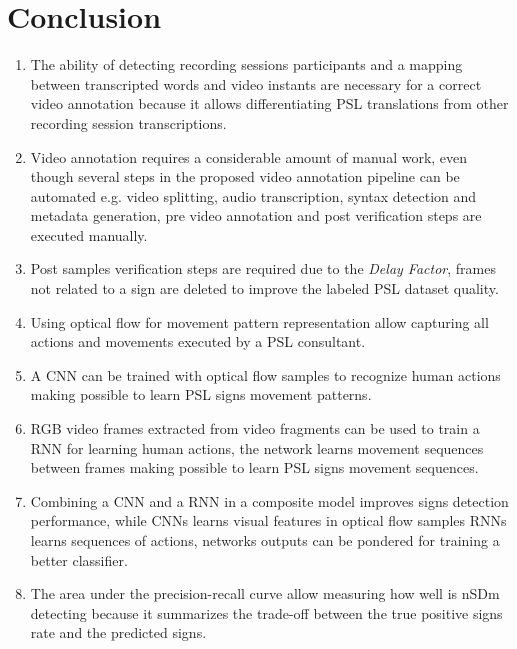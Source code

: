 \documentclass[twocolumn,conference]{article}
\begin{document}
\section{Conclusion}\label{conclusion}
\begin{enumerate}[i]
\item The ability of detecting recording sessions participants and a mapping between transcripted words and video instants are necessary for a correct video annotation because it allows differentiating PSL translations from other recording session transcriptions.
\item Video annotation requires a considerable amount of manual work, even though several steps in the proposed video annotation pipeline can be automated e.g. video splitting, audio transcription, syntax detection and metadata generation, pre video annotation and post verification steps are executed manually.
\item Post samples verification steps are required due to the \textit{Delay Factor}, frames not related to a sign are deleted to improve the labeled PSL dataset quality.
\item Using optical flow for movement pattern representation allow capturing all actions and movements executed by a PSL consultant.
\item A CNN can be trained with optical flow samples to recognize human actions making possible to learn PSL signs movement patterns.
\item RGB video frames extracted from video fragments can be used to train a RNN for learning human actions, the network learns movement sequences between frames making possible to learn PSL signs movement sequences.
\item Combining a CNN and a RNN in a composite model improves signs detection performance, while CNNs learns visual features in optical flow samples RNNs learns sequences of actions, networks outputs can be pondered for training a better classifier.
\item The area under the precision-recall curve allow measuring how well is nSDm detecting because it summarizes the trade-off between the true positive signs rate and the predicted signs.
\end{enumerate}



\end{document}
